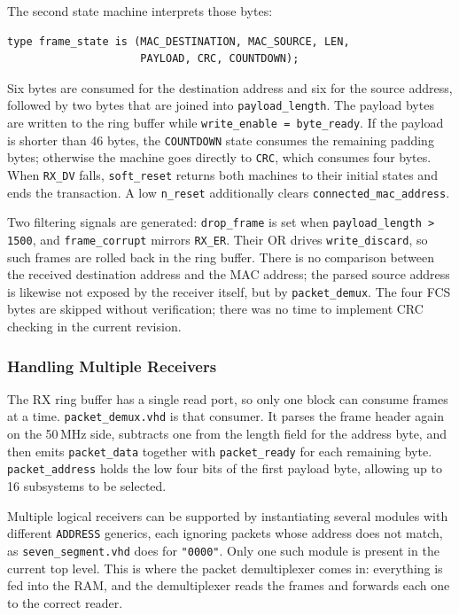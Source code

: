 \documentclass[11pt,a4paper]{article}
\begin{document}
The second state machine interprets those bytes:

\begin{lstlisting}
type frame_state is (MAC_DESTINATION, MAC_SOURCE, LEN,
                     PAYLOAD, CRC, COUNTDOWN);
\end{lstlisting}

Six bytes are consumed for the destination address and six for the source address, followed by two bytes that are joined into \texttt{payload\_length}. The payload bytes are written to the ring buffer while \texttt{write\_enable = byte\_ready}. If the payload is shorter than 46 bytes, the \texttt{COUNTDOWN} state consumes the remaining padding bytes; otherwise the machine goes directly to \texttt{CRC}, which consumes four bytes. When \texttt{RX\_DV} falls, \texttt{soft\_reset} returns both machines to their initial states and ends the transaction. A low \texttt{n\_reset} additionally clears \texttt{connected\_mac\_address}.

Two filtering signals are generated: \texttt{drop\_frame} is set when \texttt{payload\_length > 1500}, and \texttt{frame\_corrupt} mirrors \texttt{RX\_ER}. Their OR drives \texttt{write\_discard}, so such frames are rolled back in the ring buffer. There is no comparison between the received destination address and the MAC address; the parsed source address is likewise not exposed by the receiver itself, but by \texttt{packet\_demux}. The four FCS bytes are skipped without verification; there was no time to implement CRC checking in the current revision.

\subsubsection{Handling Multiple Receivers}
The RX ring buffer has a single read port, so only one block can consume frames at a time. \texttt{packet\_demux.vhd} is that consumer. It parses the frame header again on the 50\,MHz side, subtracts one from the length field for the address byte, and then emits \texttt{packet\_data} together with \texttt{packet\_ready} for each remaining byte. \texttt{packet\_address} holds the low four bits of the first payload byte, allowing up to 16 subsystems to be selected.

Multiple logical receivers can be supported by instantiating several modules with different \texttt{ADDRESS} generics, each ignoring packets whose address does not match, as \texttt{seven\_segment.vhd} does for \texttt{"0000"}. Only one such module is present in the current top level. This is where the packet demultiplexer comes in: everything is fed into the RAM, and the demultiplexer reads the frames and forwards each one to the correct reader.
\end{document}
